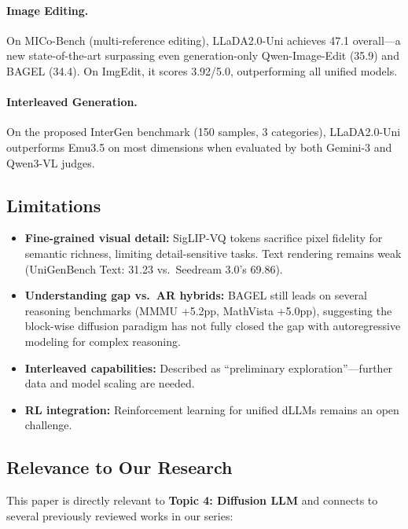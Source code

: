 \documentclass[11pt]{article}
\begin{document}
\paragraph{Image Editing.}
On MICo-Bench (multi-reference editing), LLaDA2.0-Uni achieves 47.1 overall---a new state-of-the-art surpassing even generation-only Qwen-Image-Edit (35.9) and BAGEL (34.4). On ImgEdit, it scores 3.92/5.0, outperforming all unified models.

\paragraph{Interleaved Generation.}
On the proposed InterGen benchmark (150 samples, 3 categories), LLaDA2.0-Uni outperforms Emu3.5 on most dimensions when evaluated by both Gemini-3 and Qwen3-VL judges.

\subsection{Limitations}

\begin{itemize}
    \item \textbf{Fine-grained visual detail:} SigLIP-VQ tokens sacrifice pixel fidelity for semantic richness, limiting detail-sensitive tasks. Text rendering remains weak (UniGenBench Text: 31.23 vs.\ Seedream 3.0's 69.86).
    \item \textbf{Understanding gap vs.\ AR hybrids:} BAGEL still leads on several reasoning benchmarks (MMMU +5.2pp, MathVista +5.0pp), suggesting the block-wise diffusion paradigm has not fully closed the gap with autoregressive modeling for complex reasoning.
    \item \textbf{Interleaved capabilities:} Described as ``preliminary exploration''---further data and model scaling are needed.
    \item \textbf{RL integration:} Reinforcement learning for unified dLLMs remains an open challenge.
\end{itemize}

\subsection{Relevance to Our Research}

This paper is directly relevant to \textbf{Topic 4: Diffusion LLM} and connects to several previously reviewed works in our series:
\end{document}
